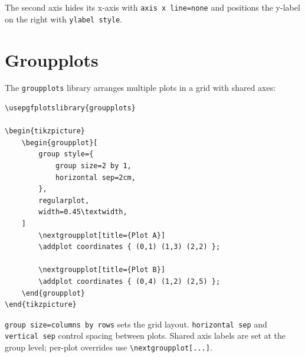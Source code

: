 The second axis hides its x-axis with \texttt{axis x line=none} and positions
the y-label on the right with \texttt{ylabel style}.

\section{Groupplots}

The \texttt{groupplots} library arranges multiple plots in a grid with shared
axes:

\begin{verbatim}
\usepgfplotslibrary{groupplots}

\begin{tikzpicture}
    \begin{groupplot}[
        group style={
            group size=2 by 1,
            horizontal sep=2cm,
        },
        regularplot,
        width=0.45\textwidth,
    ]
        \nextgroupplot[title={Plot A}]
        \addplot coordinates { (0,1) (1,3) (2,2) };

        \nextgroupplot[title={Plot B}]
        \addplot coordinates { (0,4) (1,2) (2,5) };
    \end{groupplot}
\end{tikzpicture}
\end{verbatim}

\texttt{group size=columns by rows} sets the grid layout.
\texttt{horizontal sep} and \texttt{vertical sep} control spacing between
plots. Shared axis labels are set at the group level; per-plot overrides use
\texttt{\textbackslash nextgroupplot[...]}.
